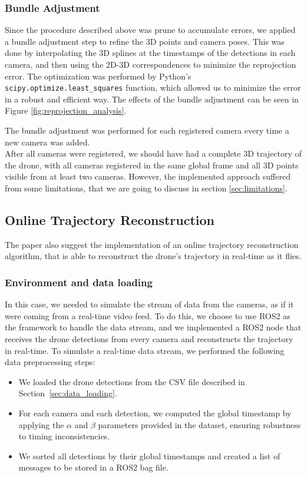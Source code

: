 \documentclass[11pt]{article}
\begin{document}
\subsubsection{Bundle Adjustment}

Since the procedure described above was prune to accumulate errors, we applied a bundle adjustment step to refine the 3D points and camera poses. This was done by interpolating the 3D splines at the timestamps of the detections in each camera, and then using the 2D-3D correspondences to minimize the reprojection error. The optimization was performed by Python's \texttt{scipy.optimize.least\_squares} function, which allowed us to minimize the error in a robust and efficient way. The effects of the bundle adjustment can be seen in Figure \ref{fig:reprojection_analysis}.

The bundle adjustment was performed for each registered camera every time a new camera was added.\\

After all cameras were registered, we should have had a complete 3D trajectory of the drone, with all cameras registered in the same global frame and all 3D points visible from at least two cameras. However, the implemented approach suffered from some limitations, that we are going to discuss in section \ref{sec:limitations}.

\subsection{Online Trajectory Reconstruction}

The paper also suggest the implementation of an online trajectory reconstruction algorithm, that is able to reconstruct the drone's trajectory in real-time as it flies.

\subsubsection{Environment and data loading}

In this case, we needed to simulate the stream of data from the cameras, as if it were coming from a real-time video feed. To do this, we choose to use ROS2 as the framework to handle the data stream, and we implemented a ROS2 node that receives the drone detections from every camera and reconstructs the trajectory in real-time.
To simulate a real-time data stream, we performed the following data preprocessing steps:
\begin{itemize}
    \item We loaded the drone detections from the CSV file described in Section~\ref{sec:data_loading}.
    \item For each camera and each detection, we computed the global timestamp by applying the $\alpha$ and $\beta$ parameters provided in the dataset, ensuring robustness to timing inconsistencies.
    \item We sorted all detections by their global timestamps and created a list of messages to be stored in a ROS2 bag file.
\end{itemize}
\end{document}
